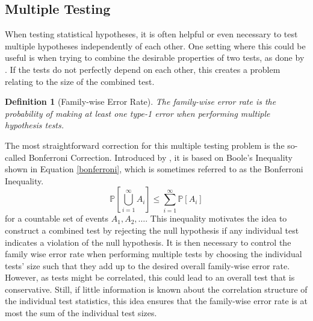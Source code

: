 \documentclass[12pt, a4paper]{article}
\theoremstyle{MAstyle} \newtheorem{assumption}{Assumption}[section]
\theoremstyle{MAstyle} \newtheorem{definition}{Definition}[section]
\theoremstyle{MAstyle} \newtheorem{theorem}{Theorem}[section]
\begin{document}
	
		\subsection{Multiple Testing}\label{Multiple_Testing}
			When testing statistical hypotheses, it is often helpful or even necessary to test multiple hypotheses independently of each other. One setting where this could be useful is when trying to combine the desirable properties of two tests, as done by \cite{bugni_permutation_2021}. If the tests do not perfectly depend on each other, this creates a problem relating to the size of the combined test.
			
			\begin{definition}[Family-wise Error Rate]
				The family-wise error rate is the probability of making at least one type-1 error when performing multiple hypothesis tests.
			\end{definition}
		
			The most straightforward correction for this multiple testing problem is the so-called Bonferroni Correction. Introduced by \cite{dunn_multiple_1961}, it is based on Boole's Inequality shown in Equation \ref{bonferroni}, which is sometimes referred to as the Bonferroni Inequality.
			\begin{equation}\label{bonferroni}
				\mathbb{P}\left[\bigcup_{i = 1}^{\infty} A_i\right] \leq \sum_{i = 1}^{\infty} \mathbb{P}\left[A_i\right]
			\end{equation}
			for a countable set of events $A_1, A_2, \dots$.
			This inequality motivates the idea to construct a combined test by rejecting the null hypothesis if any individual test indicates a violation of the null hypothesis. It is then necessary to control the family wise error rate when performing multiple tests by choosing the individual tests' size such that they add up to the desired overall family-wise error rate. However, as tests might be correlated, this could lead to an overall test that is conservative. Still, if little information is known about the correlation structure of the individual test statistics, this idea ensures that the family-wise error rate is at most the sum of the individual test sizes.		
\end{document}
